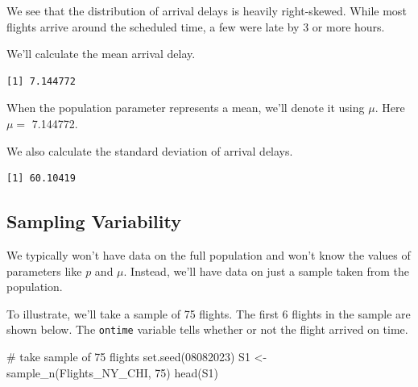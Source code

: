 \documentclass[
  letterpaper,
  DIV=11,
  numbers=noendperiod]{scrreprt}
\newenvironment{Shaded}{\begin{snugshade}}{\end{snugshade}}
\newcommand{\CommentTok}[1]{\textcolor[rgb]{0.37,0.37,0.37}{#1}}
\newcommand{\DecValTok}[1]{\textcolor[rgb]{0.68,0.00,0.00}{#1}}
\newcommand{\FunctionTok}[1]{\textcolor[rgb]{0.28,0.35,0.67}{#1}}
\newcommand{\NormalTok}[1]{\textcolor[rgb]{0.00,0.23,0.31}{#1}}
\newcommand{\OtherTok}[1]{\textcolor[rgb]{0.00,0.23,0.31}{#1}}
\newcommand{\SpecialCharTok}[1]{\textcolor[rgb]{0.37,0.37,0.37}{#1}}
\begin{document}
We see that the distribution of arrival delays is heavily right-skewed.
While most flights arrive around the scheduled time, a few were late by
3 or more hours.

We'll calculate the mean arrival delay.

\begin{Shaded}
\end{Shaded}

\begin{verbatim}
[1] 7.144772
\end{verbatim}

When the population parameter represents a mean, we'll denote it using
\(\mu\). Here \(\mu=\) 7.144772.

We also calculate the standard deviation of arrival delays.

\begin{Shaded}
\end{Shaded}

\begin{verbatim}
[1] 60.10419
\end{verbatim}

\subsection{Sampling Variability}\label{sampling-variability}

We typically won't have data on the full population and won't know the
values of parameters like \(p\) and \(\mu\). Instead, we'll have data on
just a sample taken from the population.

To illustrate, we'll take a sample of 75 flights. The first 6 flights in
the sample are shown below. The \texttt{ontime} variable tells whether
or not the flight arrived on time.

\begin{Shaded}
\begin{Highlighting}[]
\CommentTok{\# take sample of 75 flights}
\FunctionTok{set.seed}\NormalTok{(}\DecValTok{08082023}\NormalTok{)}
\NormalTok{S1 }\OtherTok{\textless{}{-}} \FunctionTok{sample\_n}\NormalTok{(Flights\_NY\_CHI, }\DecValTok{75}\NormalTok{)}
\FunctionTok{head}\NormalTok{(S1)}
\end{Highlighting}
\end{Shaded}
\end{document}
